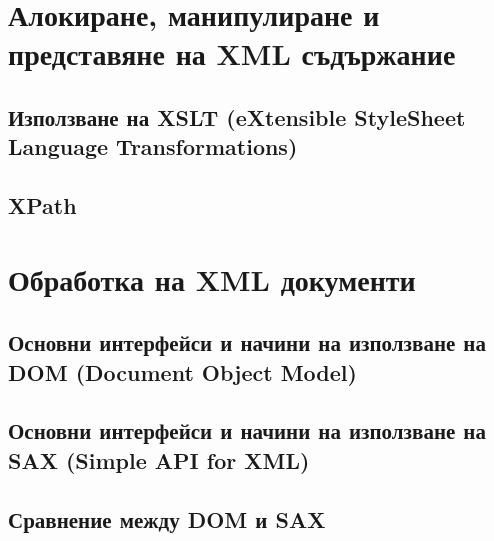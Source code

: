 \documentclass[fleqn,12pt]{article}
\begin{document}
\section{Алокиране, манипулиране и представяне на XML съдържание}

\subsection{Използване на XSLT (eXtensible StyleSheet Language Transformations)}
\subsection{XPath}

\section{Обработка на XML документи}

\subsection{Основни интерфейси и начини на използване на DOM (Document Object Model)}
\subsection{Основни интерфейси и начини на използване на SAX (Simple API for XML)}
\subsection{Сравнение между DOM и SAX}
\end{document}
